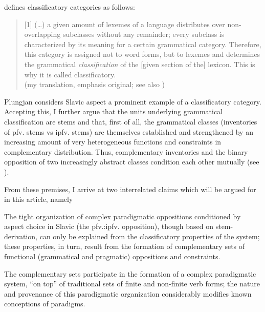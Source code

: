 \documentclass[output=paper]{langscibook}
\begin{document}
\citet[125]{Plungjan2000} defines classificatory categories as follows:

\begin{quote}
[1] (…) a given amount of lexemes of a language distributes over non-over\-lap\-ping subclasses without any remainder; every subclass is characterized by its meaning for a certain grammatical category. Therefore, this category is assigned not to word forms, but to lexemes and determines the grammatical \textit{classification} of the [given section of the] lexicon. This is why it is called classificatory.\\\hbox{}\hfill (my translation, emphasis original; see also \citealt[53--54]{Plungjan2011})\hbox{}
\end{quote}

\noindent Plungjan considers Slavic aspect a prominent example of a classificatory category. Accepting this, I further argue that the units underlying grammatical classification are stems and that, first of all, the grammatical classes (inventories of pfv. stems vs ipfv. stems) are themselves established and strengthened by an increasing amount of very heterogeneous functions and constraints in complementary distribution. Thus, complementary inventories and the binary opposition of two increasingly abstract classes condition each other mutually (see ).

From these premises, I arrive at two interrelated claims which will be argued for in this article, namely

\begin{description}\sloppy
\item[Claim 1:]  The tight organization of complex paradigmatic oppositions conditioned by aspect choice in Slavic (the pfv.:ipfv. opposition), though based on stem-derivation, can only be explained from the classificatory properties of the system; these properties, in turn, result from the formation of complementary sets of functional (grammatical and pragmatic) oppositions and constraints.
\item[Claim 2:]   The complementary sets participate in the formation of a complex paradigmatic system, “on top” of traditional sets of finite and non-finite verb forms; the nature and provenance of this paradigmatic organization considerably modifies known conceptions of paradigms.
\end{description}
\end{document}
